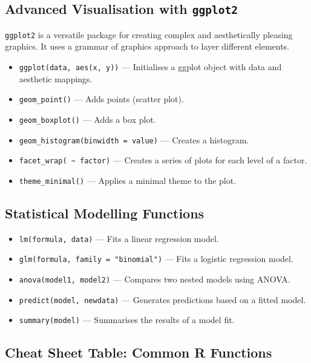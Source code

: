 \subsection{Advanced Visualisation with \texttt{ggplot2}}

\texttt{ggplot2} is a versatile package for creating complex and aesthetically pleasing graphics. It uses a grammar of graphics approach to layer different elements.

\begin{itemize}
    \item \texttt{ggplot(data, aes(x, y))} --- Initialises a ggplot object with data and aesthetic mappings.
    \item \texttt{geom\_point()} --- Adds points (scatter plot).
    \item \texttt{geom\_boxplot()} --- Adds a box plot.
    \item \texttt{geom\_histogram(binwidth = value)} --- Creates a histogram.
    \item \texttt{facet\_wrap( \textasciitilde{} factor)} --- Creates a series of plots for each level of a factor.
    \item \texttt{theme\_minimal()} --- Applies a minimal theme to the plot.
\end{itemize}

\subsection{Statistical Modelling Functions}

\begin{itemize}
    \item \texttt{lm(formula, data)} --- Fits a linear regression model.
    \item \texttt{glm(formula, family = "binomial")} --- Fits a logistic regression model.
    \item \texttt{anova(model1, model2)} --- Compares two nested models using ANOVA.
    \item \texttt{predict(model, newdata)} --- Generates predictions based on a fitted model.
    \item \texttt{summary(model)} --- Summarises the results of a model fit.
\end{itemize}

\subsection{Cheat Sheet Table: Common R Functions}

